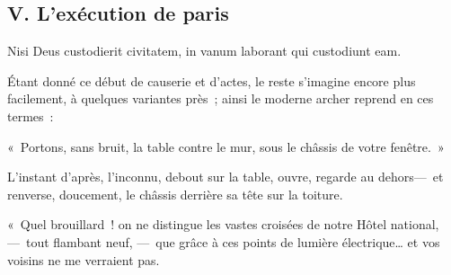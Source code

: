 \documentclass[french,twoside]{book} %
\newcommand{\bibl}[1]{{\RaggedLeft{#1}\par\bigskip}}
\begin{document}
 \subsection[{V. L’exécution de paris}]{V. L’exécution de paris}
\noindent Nisi Deus custodierit civitatem, in vanum laborant qui custodiunt eam.\par

\bibl{Psaumes.}
\noindent Étant donné ce début de causerie et d’actes, le reste s’imagine encore plus facilement, à quelques variantes près ; ainsi le moderne archer reprend en ces termes :\par
« Portons, sans bruit, la table contre le mur, sous le châssis de votre fenêtre. »\par
L’instant d’après, l’inconnu, debout sur la table, ouvre, regarde au dehors— et renverse, doucement, le châssis derrière sa tête sur la toiture.\par
« Quel brouillard ! on ne distingue les vastes   croisées de notre Hôtel national, — tout flambant neuf, — que grâce à ces points de lumière électrique… et vos voisins ne me verraient pas.\par
\end{document}
